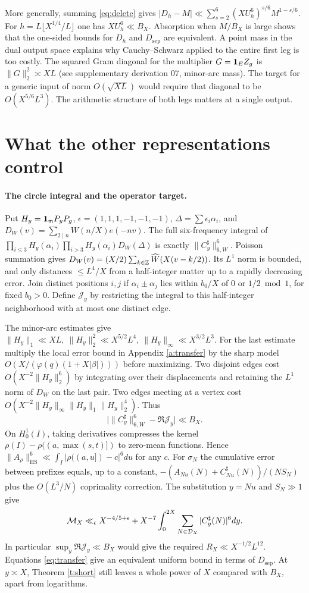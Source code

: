 \documentclass[11pt,a4paper]{article}
\newcommand{\HS}{{\mathrm{HS}}}\newcommand{\sep}{{\mathrm{sep}}}
\begin{document}
More generally, summing \eqref{eq:delete} gives \(|D_h-M|\ll\sum_{s=2}^6 (XU_h^6)^{s/6}M^{1-s/6}\). For \(h=L\lfloor X^{1/4}/L\rfloor\) one has \(XU_h^6\ll B_X\). Absorption when \(M/B_X\) is large shows that the one-sided bounds for \(D_h\) and \(D_{\sep}\) are equivalent. A point mass in the dual output space explains why Cauchy--Schwarz applied to the entire first leg is too costly. The squared Gram diagonal for the multiplier \(G=\mathbf1_E Z_g\) is \(\|G\|_2^2\asymp XL\) (see supplementary derivation 07, minor-arc mass). The target for a generic input of norm \(O(\sqrt{XL})\) would require that diagonal to be \(O(X^{5/6}L^3)\). The arithmetic structure of both legs matters at a single output.

\section{What the other representations control}\label{s:other}
\paragraph{The circle integral and the operator target.}
Put \(H_y=\mathbf1_{{\mathfrak m}}P_yP_g\), \(\epsilon=(1,1,1,-1,-1,-1)\), \(\Delta=\sum\epsilon_i\alpha_i\), and \(D_W(v)=\sum_{2\mid n}W(n/X)e(-nv)\). The full six-frequency integral of \(\prod_{i\le3}H_y(\alpha_i)\prod_{i>3}\overline{H_y(\alpha_i)}D_W(\Delta)\) is exactly \(\|C_y^\sharp\|_{6,W}^6\). Poisson summation gives \(D_W(v)=(X/2)\sum_{k\in{\mathbb Z}}\widehat W(X(v-k/2))\). Its \(L^1\) norm is bounded, and only distances \(\le L^4/X\) from a half-integer matter up to a rapidly decreasing error. Join distinct positions \(i,j\) if \(\alpha_i\pm\alpha_j\) lies within \(b_0/X\) of \(0\) or \(1/2\bmod1\), for fixed \(b_0>0\). Define \(\mathcal J_y\) by restricting the integral to this half-integer neighborhood with at most one distinct edge.

The minor-arc estimates give \(\|H_y\|_1\ll XL,\ \|H_y\|_2^2\ll X^{5/2}L^4,\ \|H_y\|_\infty\ll X^{3/2}L^3\). For the last estimate multiply the local error bound in Appendix \ref{a:transfer} by the sharp model \(O(X/(\varphi(q)(1+X|\beta|)))\) before maximizing. Two disjoint edges cost \(O(X^{-2}\|H_y\|_2^6)\) by integrating over their displacements and retaining the \(L^1\) norm of \(D_W\) on the last pair. Two edges meeting at a vertex cost \(O(X^{-2}\|H_y\|_\infty\|H_y\|_1\|H_y\|_2^4)\). Thus
\[
 \big|\|C_y^\sharp\|_{6,W}^6-\Re\mathcal J_y\big|\ll B_X .
\]
On \(H_0^1(I)\), taking derivatives compresses the kernel \(\rho(I)-\rho((a,\max(s,t)])\) to zero-mean functions. Hence \(\|A_\rho\|_{\HS}^6\ll\int_I|\rho((a,u])-c|^6du\) for any \(c\). For \(\sigma_N\) the cumulative error between prefixes equals, up to a constant, \(-(A_{Nu}(N)+C_{Nu}^\sharp(N))/(NS_N)\) plus the \(O(L^3/N)\) coprimality correction. The substitution \(y=Nu\) and \(S_N\gg1\) give
\[
 {\cal M}_X\ll_\epsilon X^{-4/5+\epsilon}
     +X^{-7}\int_0^{2X}\sum_{N\in{\cal D}_X}|C_y^\sharp(N)|^6dy.
\]
In particular \(\sup_y\Re\mathcal J_y\ll B_X\) would give the required \(R_X\ll X^{-1/2}L^{12}\). Equations \eqref{eq:transfer} give an equivalent uniform bound in terms of \(D_{\sep}\). At \(y\asymp X\), Theorem \ref{t:short} still leaves a whole power of \(X\) compared with \(B_X\), apart from logarithms.
\end{document}
